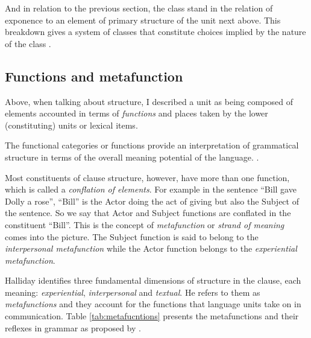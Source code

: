 And in relation to the previous section, the class stand in the relation of exponence to an element of primary structure of the unit next above. This breakdown gives a system of classes that constitute choices implied by the nature of the class \citep[41]{Halliday2002}. 



\subsection{Functions and metafunction}
Above, when talking about structure, I described a unit as being composed of elements accounted in terms of \textit{functions} and places taken by the lower (constituting) units or lexical items.

\begin{definition}[Function]\label{def:function}
	The functional categories or functions provide an interpretation of grammatical structure in terms of the overall meaning potential of the language. \citep[76]{Halliday2013}.
\end{definition}

Most constituents of clause structure, however, have more than one function, which is called a \textit{conflation of elements}. For example in the sentence ``Bill gave Dolly a rose'', ``Bill'' is the Actor doing the act of giving but also the Subject of the sentence. So we say that Actor and Subject functions are conflated in the constituent ``Bill''. This is the concept of \textit{metafunction} or \textit{strand of meaning} comes into the picture. The Subject function is said to belong to the \textit{interpersonal metafunction} while the Actor function belongs to the \textit{experiential metafunction}. 

Halliday identifies three fundamental dimensions of structure in the clause, each meaning: \textit{experiential}, \textit{interpersonal} and \textit{textual}. He refers to them as \textit{metafunctions} and they account for the functions that language units take on in communication. Table \ref{tab:metafucntions} presents the metafunctions and their reflexes in grammar as proposed by  \citet[85]{Halliday2013}.

